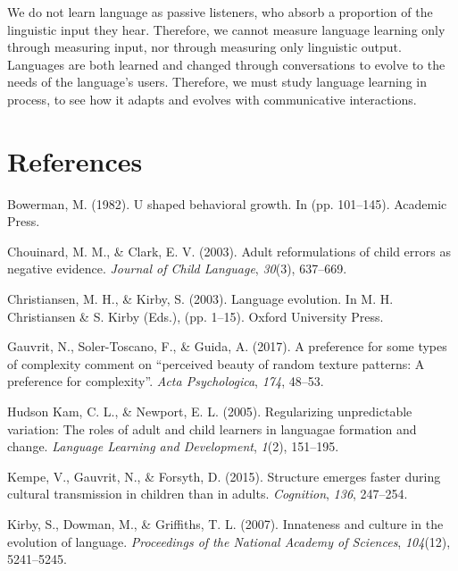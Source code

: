 \documentclass[10pt, letterpaper]{article}
\begin{document}
We do not learn language as passive listeners, who absorb a proportion
of the linguistic input they hear. Therefore, we cannot measure language
learning only through measuring input, nor through measuring only
linguistic output. Languages are both learned and changed through
conversations to evolve to the needs of the language's users. Therefore,
we must study language learning in process, to see how it adapts and
evolves with communicative interactions.

\hypertarget{references}{%
\section{References}\label{references}}

\setlength{\parindent}{-0.1in} 
\setlength{\leftskip}{0.125in}

\noindent

\hypertarget{refs}{}
\leavevmode\hypertarget{ref-bowerman-1982}{}%
Bowerman, M. (1982). U shaped behavioral growth. In (pp. 101--145).
Academic Press.

\leavevmode\hypertarget{ref-chouinard-2003}{}%
Chouinard, M. M., \& Clark, E. V. (2003). Adult reformulations of child
errors as negative evidence. \emph{Journal of Child Language},
\emph{30}(3), 637--669.

\leavevmode\hypertarget{ref-christiansen-2003}{}%
Christiansen, M. H., \& Kirby, S. (2003). Language evolution. In M. H.
Christiansen \& S. Kirby (Eds.), (pp. 1--15). Oxford University Press.

\leavevmode\hypertarget{ref-gauvrit-2017}{}%
Gauvrit, N., Soler-Toscano, F., \& Guida, A. (2017). A preference for
some types of complexity comment on ``perceived beauty of random texture
patterns: A preference for complexity''. \emph{Acta Psychologica},
\emph{174}, 48--53.

\leavevmode\hypertarget{ref-hudsonkam-2005}{}%
Hudson Kam, C. L., \& Newport, E. L. (2005). Regularizing unpredictable
variation: The roles of adult and child learners in languagae formation
and change. \emph{Language Learning and Development}, \emph{1}(2),
151--195.

\leavevmode\hypertarget{ref-kempe-2015}{}%
Kempe, V., Gauvrit, N., \& Forsyth, D. (2015). Structure emerges faster
during cultural transmission in children than in adults.
\emph{Cognition}, \emph{136}, 247--254.

\leavevmode\hypertarget{ref-kirby-2007}{}%
Kirby, S., Dowman, M., \& Griffiths, T. L. (2007). Innateness and
culture in the evolution of language. \emph{Proceedings of the National
Academy of Sciences}, \emph{104}(12), 5241--5245.
\end{document}
